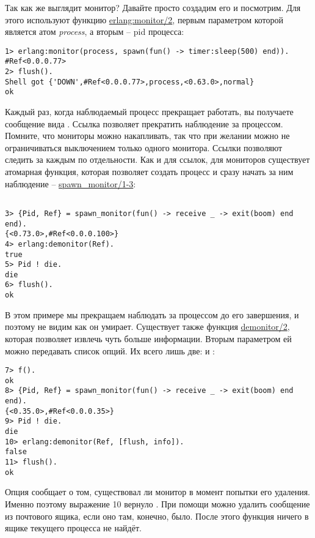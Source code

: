 Так как же выглядит монитор?
Давайте просто создадим его и посмотрим.
Для этого используют функцию \href{http://erldocs.com/R15B/erts/erlang.html\#monitor/2}{erlang:monitor/2}, первым параметром которой является атом \emph{process}, а вторым \--- pid процесса:
\begin{lstlisting}[style=erlang]
1> erlang:monitor(process, spawn(fun() -> timer:sleep(500) end)).
#Ref<0.0.0.77>
2> flush().
Shell got {'DOWN',#Ref<0.0.0.77>,process,<0.63.0>,normal}
ok
\end{lstlisting}

Каждый раз, когда наблюдаемый процесс прекращает работать, вы получаете сообщение вида .
Ссылка позволяет прекратить наблюдение за процессом.
Помните, что мониторы можно накапливать, так что при желании можно не ограничиваться выключением только одного монитора.
Ссылки позволяют следить за каждым по отдельности.
Как и для ссылок, для мониторов существует атомарная функция, которая позволяет создать процесс и сразу начать за ним наблюдение \--- \href{http://erldocs.com/R15B/erts/erlang.html\#spawn_monitor/1}{spawn\_monitor/1-3}:
\begin{lstlisting}[style=erlang]

3> {Pid, Ref} = spawn_monitor(fun() -> receive _ -> exit(boom) end end).
{<0.73.0>,#Ref<0.0.0.100>}
4> erlang:demonitor(Ref).
true
5> Pid ! die.
die
6> flush().
ok
\end{lstlisting}

В этом примере мы прекращаем наблюдать за процессом до его завершения, и поэтому не видим как он умирает.
Существует также функция \href{http://erldocs.com/R15B/erts/erlang.html\#demonitor/2}{demonitor/2}, которая позволяет извлечь чуть больше информации.
Вторым параметром ей можно передавать список опций.
Их всего лишь две:  и :
\begin{lstlisting}[style=erlang]
7> f().
ok
8> {Pid, Ref} = spawn_monitor(fun() -> receive _ -> exit(boom) end end).
{<0.35.0>,#Ref<0.0.0.35>}
9> Pid ! die.
die
10> erlang:demonitor(Ref, [flush, info]).
false
11> flush().
ok
\end{lstlisting}

Опция  сообщает о том, существовал ли монитор в момент попытки его удаления.
Именно поэтому выражение 10 вернуло .
При помощи  можно удалить сообщение  из почтового ящика, если оно там, конечно, было.
После этого функция  ничего в ящике текущего процесса не найдёт.
